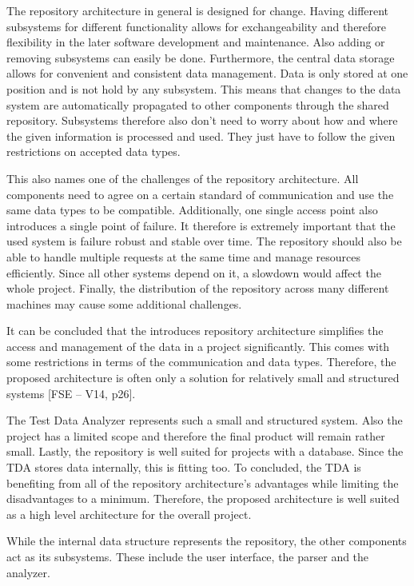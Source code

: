 The repository architecture in general is designed for change. Having different subsystems for different functionality allows for exchangeability and therefore flexibility in the later software development and maintenance. Also adding or removing subsystems can easily be done. Furthermore, the central data storage allows for convenient and consistent data management. Data is only stored at one position and is not hold by any subsystem. This means that changes to the data system are automatically propagated to other components through the shared repository. Subsystems therefore also don't need to worry about how and where the given information is processed and used. They just have to follow the given restrictions on accepted data types.

This also names one of the challenges of the repository architecture. All components need to agree on a certain standard of communication and use the same data types to be compatible. Additionally, one single access point also introduces a single point of failure. It therefore is extremely important that the used system is failure robust and stable over time. The repository should also be able to handle multiple requests at the same time and manage resources efficiently. Since all other systems depend on it, a slowdown would affect the whole project. Finally, the distribution of the repository across many different machines may cause some additional challenges.

It can be concluded that the introduces repository architecture simplifies the access and management of the data in a project significantly. This comes with some restrictions in terms of the communication and data types. Therefore, the proposed architecture is often only a solution for relatively small and structured systems [FSE – V14, p26].

The Test Data Analyzer represents such a small and structured system. Also the project has a limited scope and therefore the final product will remain rather small. Lastly, the repository is well suited for projects with a database. Since the TDA stores data internally, this is fitting too. To concluded, the TDA is benefiting from all of the repository architecture's advantages while limiting the disadvantages to a minimum. Therefore, the proposed architecture is well suited as a high level architecture for the overall project.

While the internal data structure represents the repository, the other components act as its subsystems. These include the user interface, the parser and the analyzer.

